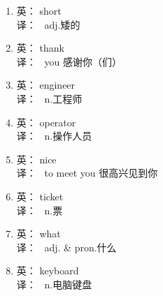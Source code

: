 {\begin{multicols}{2}
\begin{enumerate}
\item 英： short \\ 译： \ adj.矮的
\item 英： thank \\ 译： \ you 感谢你（们）
\item 英： engineer \\ 译： \ n.工程师
\item 英： operator \\ 译： \ n.操作人员
\item 英： nice \\ 译： \ to meet you 很高兴见到你
\item 英： ticket \\ 译： \ n.票
\item 英： what \\ 译： \ adj. \& pron.什么
\item 英： keyboard \\ 译： \ n.电脑键盘
 \end{enumerate}\end{multicols} }
